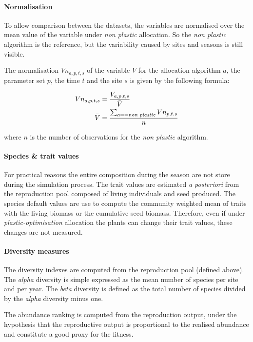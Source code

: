 \paragraph{Normalisation}
To allow comparison between the datasets, the variables are normalised over the mean value of the variable under \textit{non plastic} allocation. So the \textit{non plastic} algorithm is the reference, but the variability caused by sites and seasons is still visible.

The normalisation $Vn_{a, p, t, s}$ of the variable $V$ for the allocation algorithm $a$, the parameter set $p$, the time $t$ and the site $s$ is given by the following formula:

\begin{align}
Vn_{a, p, t, s} &= \frac{V_{a, p, t, s}}{ \bar{V} }\\
\bar{V} &= \frac{\sum_{a == \text{\textit{non plastic}}}{} Vn_{p, t, s} }{n}
\end{align}

where $n$ is the number of observations for the \textit{non plastic} algorithm.

\paragraph{Species \& trait values}

For practical reasons the entire composition during the season are not store during the simulation process. The trait values are estimated \textit{a posteriori} from the reproduction pool composed of living individuals and seed produced. The species default values are use to compute the community weighted mean of traits with the living biomass or the cumulative seed biomass. Therefore, even if under \textit{plastic-optimisation} allocation the plants can change their trait values, these changes are not measured.

\paragraph{Diversity measures}

The diversity indexes are computed from the reproduction pool (defined above). The \textit{alpha} diversity is simple expressed as the mean number of species per site and per year. The \textit{beta} diversity is defined as the total number of species divided by the \textit{alpha} diversity minus one. 

The abundance ranking is computed from the reproduction output, under the hypothesis that the reproductive output is proportional to the realised abundance and constitute a good proxy for the fitness.

